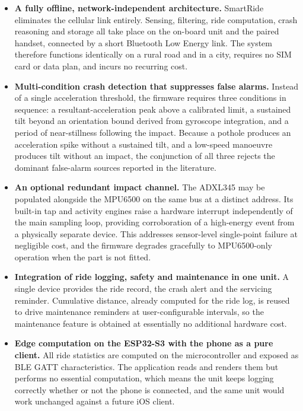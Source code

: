\documentclass[12pt,a4paper,oneside]{report}
\begin{document}
\begin{itemize}[leftmargin=*,itemsep=0.6em,topsep=0.7em]
\item \textbf{A fully offline, network-independent architecture.} SmartRide eliminates the
cellular link entirely. Sensing, filtering, ride computation, crash reasoning and storage
all take place on the on-board unit and the paired handset, connected by a short Bluetooth
Low Energy link. The system therefore functions identically on a rural road and in a city,
requires no SIM card or data plan, and incurs no recurring cost.

\item \textbf{Multi-condition crash detection that suppresses false alarms.} Instead of a
single acceleration threshold, the firmware requires three conditions in sequence: a
resultant-acceleration peak above a calibrated limit, a sustained tilt beyond an
orientation bound derived from gyroscope integration, and a period of near-stillness
following the impact. Because a pothole produces an acceleration spike without a sustained
tilt, and a low-speed manoeuvre produces tilt without an impact, the conjunction of all
three rejects the dominant false-alarm sources reported in the literature.

\item \textbf{An optional redundant impact channel.} The ADXL345 may be populated alongside
the MPU6500 on the same bus at a distinct address. Its built-in tap and activity engines
raise a hardware interrupt independently of the main sampling loop, providing corroboration
of a high-energy event from a physically separate device. This addresses sensor-level
single-point failure at negligible cost, and the firmware degrades gracefully to
MPU6500-only operation when the part is not fitted.

\item \textbf{Integration of ride logging, safety and maintenance in one unit.} A single
device provides the ride record, the crash alert and the servicing reminder. Cumulative
distance, already computed for the ride log, is reused to drive maintenance reminders at
user-configurable intervals, so the maintenance feature is obtained at essentially no
additional hardware cost.

\item \textbf{Edge computation on the ESP32-S3 with the phone as a pure client.} All ride
statistics are computed on the microcontroller and exposed as BLE GATT characteristics.
The application reads and renders them but performs no essential computation, which means
the unit keeps logging correctly whether or not the phone is connected, and the same unit
would work unchanged against a future iOS client.


\end{itemize}
\end{document}
